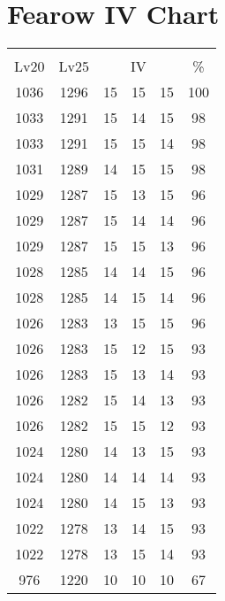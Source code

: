 \documentclass{article}%
\begin{document}
%
\normalsize%
\section{Fearow IV Chart}%
\label{sec:Fearow IV Chart}%
\renewcommand{\arraystretch}{1.5}%
\begin{tabular}{|c|c|c|c|c|c|}%
\hline%
\multicolumn{6}{|c|}{\textcolor{white}{ 
\linebreak{Fearow}
}%
\cellcolor{black}}\\%
\multicolumn{1}{|c}{Lv20}&\multicolumn{1}{c|}{Lv25}&\multicolumn{3}{c|}{IV}&\multicolumn{1}{|c|}{\%}\\%
\hline%
\rowcolor{color100}%
1036&1296&15&15&15&100\\%
\hline%
\rowcolor{color98}%
1033&1291&15&14&15&98\\%
\hline%
\rowcolor{color98}%
1033&1291&15&15&14&98\\%
\hline%
\rowcolor{color98}%
1031&1289&14&15&15&98\\%
\hline%
\rowcolor{color96}%
1029&1287&15&13&15&96\\%
\hline%
\rowcolor{color96}%
1029&1287&15&14&14&96\\%
\hline%
\rowcolor{color96}%
1029&1287&15&15&13&96\\%
\hline%
\rowcolor{color96}%
1028&1285&14&14&15&96\\%
\hline%
\rowcolor{color96}%
1028&1285&14&15&14&96\\%
\hline%
\rowcolor{color96}%
1026&1283&13&15&15&96\\%
\hline%
\rowcolor{color93}%
1026&1283&15&12&15&93\\%
\hline%
\rowcolor{color93}%
1026&1283&15&13&14&93\\%
\hline%
\rowcolor{color93}%
1026&1282&15&14&13&93\\%
\hline%
\rowcolor{color93}%
1026&1282&15&15&12&93\\%
\hline%
\rowcolor{color93}%
1024&1280&14&13&15&93\\%
\hline%
\rowcolor{color93}%
1024&1280&14&14&14&93\\%
\hline%
\rowcolor{color93}%
1024&1280&14&15&13&93\\%
\hline%
\rowcolor{color93}%
1022&1278&13&14&15&93\\%
\hline%
\rowcolor{color93}%
1022&1278&13&15&14&93\\%
\hline%
\rowcolor{color91}%
976&1220&10&10&10&67\\%
\end{tabular}

%
\end{document}
